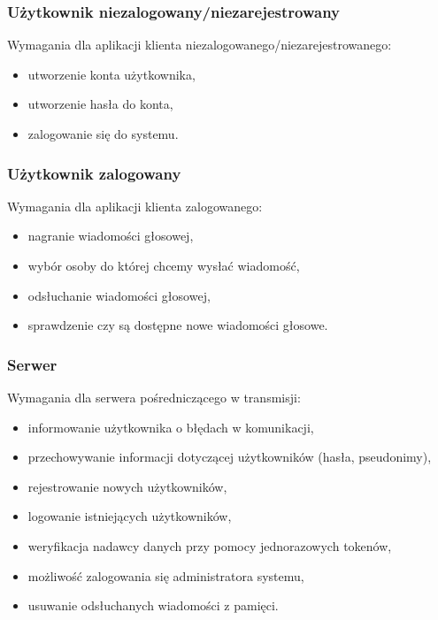 \documentclass[12pt,a4paper]{article}
\begin{document}
	\subsubsection{Użytkownik niezalogowany/niezarejestrowany}
	\par Wymagania dla aplikacji klienta niezalogowanego/niezarejestrowanego:
	\begin{itemize}
		\item utworzenie konta użytkownika,
		\item utworzenie hasła do konta,
		\item zalogowanie się do systemu.
	\end{itemize}
	\subsubsection{Użytkownik zalogowany}
	\par Wymagania dla aplikacji klienta zalogowanego:
	\begin{itemize}
		\item nagranie wiadomości głosowej,
		\item wybór osoby do której chcemy wysłać wiadomość,
		\item odsłuchanie wiadomości głosowej,
		\item sprawdzenie czy są dostępne nowe wiadomości głosowe.
	\end{itemize}
	\subsubsection{Serwer}
	\par Wymagania dla serwera pośredniczącego w transmisji:
	\begin{itemize}
		\item informowanie użytkownika o błędach w komunikacji,
		\item przechowywanie informacji dotyczącej użytkowników (hasła, pseudonimy),
		\item rejestrowanie nowych użytkowników,
		\item logowanie istniejących użytkowników,
		\item weryfikacja nadawcy danych przy pomocy jednorazowych tokenów,
		\item możliwość zalogowania się administratora systemu,
		\item usuwanie odsłuchanych wiadomości z pamięci.
	\end{itemize}
	
\end{document}

